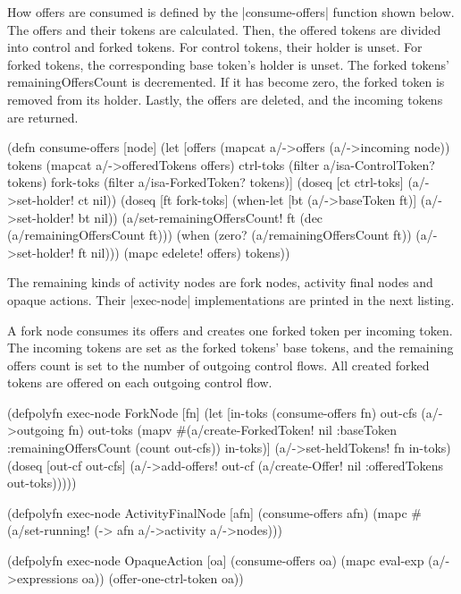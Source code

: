 \documentclass[submission]{eptcs}
\newcommand{\code}{\clojureinline}
\begin{document}
How offers are consumed is defined by the \code|consume-offers| function shown
below.  The offers and their tokens are calculated.  Then, the offered tokens
are divided into control and forked tokens.  For control tokens, their holder
is unset.  For forked tokens, the corresponding base token's holder is unset.
The forked tokens' \textsf{remainingOffersCount} is decremented.  If it has
become zero, the forked token is removed from its holder.  Lastly, the offers
are deleted, and the incoming tokens are returned.

\begin{clojurecode}
(defn consume-offers [node]
  (let [offers    (mapcat a/->offers (a/->incoming node))
        tokens    (mapcat a/->offeredTokens offers)
        ctrl-toks (filter a/isa-ControlToken? tokens)
        fork-toks (filter a/isa-ForkedToken? tokens)]
    (doseq [ct ctrl-toks]
      (a/->set-holder! ct nil))
    (doseq [ft fork-toks]
      (when-let [bt (a/->baseToken ft)]
        (a/->set-holder! bt nil))
      (a/set-remainingOffersCount! ft (dec (a/remainingOffersCount ft)))
      (when (zero? (a/remainingOffersCount ft))
        (a/->set-holder! ft nil)))
    (mapc edelete! offers)
    tokens))
\end{clojurecode}

The remaining kinds of activity nodes are fork nodes, activity final nodes and
opaque actions.  Their \code|exec-node| implementations are printed in the next
listing.

A fork node consumes its offers and creates one forked token per incoming
token.  The incoming tokens are set as the forked tokens' base tokens, and the
remaining offers count is set to the number of outgoing control flows.  All
created forked tokens are offered on each outgoing control flow.

\begin{clojurecode}
(defpolyfn exec-node ForkNode [fn]
  (let [in-toks  (consume-offers fn)
        out-cfs  (a/->outgoing fn)
        out-toks (mapv #(a/create-ForkedToken!
                         nil {:baseToken %
                              :remainingOffersCount (count out-cfs)})
                       in-toks)]
    (a/->set-heldTokens! fn in-toks)
    (doseq [out-cf out-cfs]
      (a/->add-offers! out-cf (a/create-Offer!
                               nil {:offeredTokens out-toks})))))

(defpolyfn exec-node ActivityFinalNode [afn]
  (consume-offers afn)
  (mapc #(a/set-running! %
        (-> afn a/->activity a/->nodes)))

(defpolyfn exec-node OpaqueAction [oa]
  (consume-offers oa)
  (mapc eval-exp (a/->expressions oa))
  (offer-one-ctrl-token oa))
\end{clojurecode}
\end{document}

